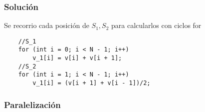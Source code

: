 \documentclass[letterpaper]{article}
\theoremstyle{definition}
\theoremstyle{lemathm}
\theoremstyle{lemathm}
\theoremstyle{lemathm}
\theoremstyle{lemademthm}
\newcommand{\1}{\mathbbm{1}}
\begin{document}
	\subsubsection*{Solución}

	Se recorrio cada posición de $S_1,S_2$ para calcularlos con ciclos for
	
	\begin{verbatim}
	//S_1
	for (int i = 0; i < N - 1; i++)
        v_1[i] = v[i] + v[i + 1];
	//S_2
	for (int i = 1; i < N - 1; i++)
        v_1[i] = (v[i + 1] + v[i - 1])/2;
	\end{verbatim}

	\subsubsection*{Paralelización}
\end{document}
